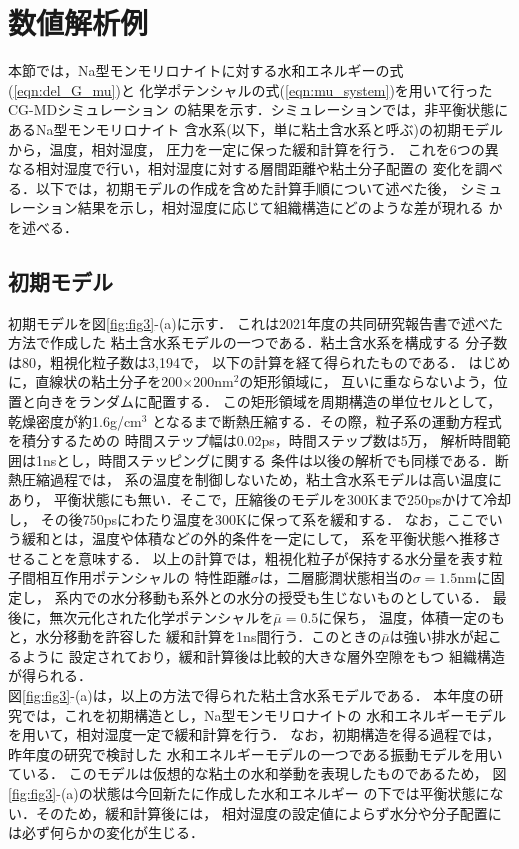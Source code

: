 \section{数値解析例}
本節では，Na型モンモリロナイトに対する水和エネルギーの式(\ref{eqn:del_G_mu})と
化学ポテンシャルの式(\ref{eqn:mu_system})を用いて行ったCG-MDシミュレーション
の結果を示す．シミュレーションでは，非平衡状態にあるNa型モンモリロナイト
含水系(以下，単に粘土含水系と呼ぶ)の初期モデルから，温度，相対湿度，
圧力を一定に保った緩和計算を行う．
これを6つの異なる相対湿度で行い，相対湿度に対する層間距離や粘土分子配置の
変化を調べる．以下では，初期モデルの作成を含めた計算手順について述べた後，
シミュレーション結果を示し，相対湿度に応じて組織構造にどのような差が現れる
かを述べる．
\subsection{初期モデル}
初期モデルを図\ref{fig:fig3}-(a)に示す．
これは2021年度の共同研究報告書で述べた方法で作成した
粘土含水系モデルの一つである．粘土含水系を構成する
分子数は80，粗視化粒子数は3,194で，
以下の計算を経て得られたものである．
はじめに，直線状の粘土分子を200$\times$200nm$^2$の矩形領域に，
互いに重ならないよう，位置と向きをランダムに配置する．
この矩形領域を周期構造の単位セルとして，乾燥密度が約1.6g/cm$^{3}$
となるまで断熱圧縮する．その際，粒子系の運動方程式を積分するための
時間ステップ幅は0.02ps，時間ステップ数は5万，
解析時間範囲は1nsとし，時間ステッピングに関する
条件は以後の解析でも同様である．断熱圧縮過程では，
系の温度を制御しないため，粘土含水系モデルは高い温度にあり，
平衡状態にも無い．そこで，圧縮後のモデルを300Kまで$250$psかけて冷却し，
その後750psにわたり温度を300Kに保って系を緩和する．
なお，ここでいう緩和とは，温度や体積などの外的条件を一定にして，
系を平衡状態へ推移させることを意味する．
以上の計算では，粗視化粒子が保持する水分量を表す粒子間相互作用ポテンシャルの
特性距離$\sigma$は，二層膨潤状態相当の$\sigma=1.5$nmに固定し，
系内での水分移動も系外との水分の授受も生じないものとしている．
最後に，無次元化された化学ポテンシャルを$\bar \mu =0.5$に保ち，
温度，体積一定のもと，水分移動を許容した
緩和計算を1ns間行う．このときの$\bar \mu$は強い排水が起こるように
設定されており，緩和計算後は比較的大きな層外空隙をもつ
組織構造が得られる．\\
\hspace{\parindent}
図\ref{fig:fig3}-(a)は，以上の方法で得られた粘土含水系モデルである．
本年度の研究では，これを初期構造とし，Na型モンモリロナイトの
水和エネルギーモデルを用いて，相対湿度一定で緩和計算を行う．
なお，初期構造を得る過程では，昨年度の研究で検討した
水和エネルギーモデルの一つである振動モデルを用いている．
このモデルは仮想的な粘土の水和挙動を表現したものであるため，
図\ref{fig:fig3}-(a)の状態は今回新たに作成した水和エネルギー
の下では平衡状態にない．そのため，緩和計算後には，
相対湿度の設定値によらず水分や分子配置には必ず何らかの変化が生じる．
